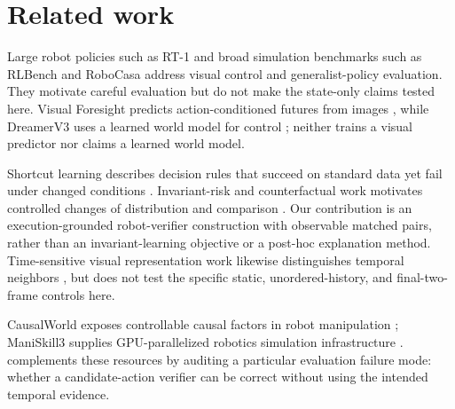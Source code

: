 \section{Related work}
Large robot policies such as RT-1 \cite{brohan2022rt1} and broad simulation benchmarks such as RLBench and RoboCasa \cite{james2019rlbench,nasiriany2024robocasa} address visual control and generalist-policy evaluation. They motivate careful evaluation but do not make the state-only claims tested here. Visual Foresight predicts action-conditioned futures from images \cite{ebert2018visualforesight}, while DreamerV3 uses a learned world model for control \cite{hafner2023dreamerv3}; \bench neither trains a visual predictor nor claims a learned world model.

Shortcut learning describes decision rules that succeed on standard data yet fail under changed conditions \cite{geirhos2020shortcut}. Invariant-risk and counterfactual work motivates controlled changes of distribution and comparison \cite{arjovsky2019irm,watchter2017counterfactual}. Our contribution is an execution-grounded robot-verifier construction with observable matched pairs, rather than an invariant-learning objective or a post-hoc explanation method. Time-sensitive visual representation work likewise distinguishes temporal neighbors \cite{sermanet2017tcn}, but does not test the specific static, unordered-history, and final-two-frame controls here.

CausalWorld exposes controllable causal factors in robot manipulation \cite{ahmed2020causalworld}; ManiSkill3 supplies GPU-parallelized robotics simulation infrastructure \cite{tao2024maniskill3}. \bench complements these resources by auditing a particular evaluation failure mode: whether a candidate-action verifier can be correct without using the intended temporal evidence.
